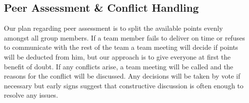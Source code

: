 \documentclass[11pt]{article}
\begin{document}
	\subsection{Peer Assessment \& Conflict Handling}
	Our plan regarding peer assessment is to split the available points evenly amongst all group members. If a team member fails to deliver on time or refuses to communicate with the rest of the team a team meeting will decide if points will be deducted from him, but our approach is to give everyone at first the benefit of doubt. If any conflicts arise, a team meeting will be called and the reasons for the conflict will be discussed. Any decisions will be taken by vote if necessary but early signs suggest that constructive discussion is often enough to resolve any issues.  
\end{document}
